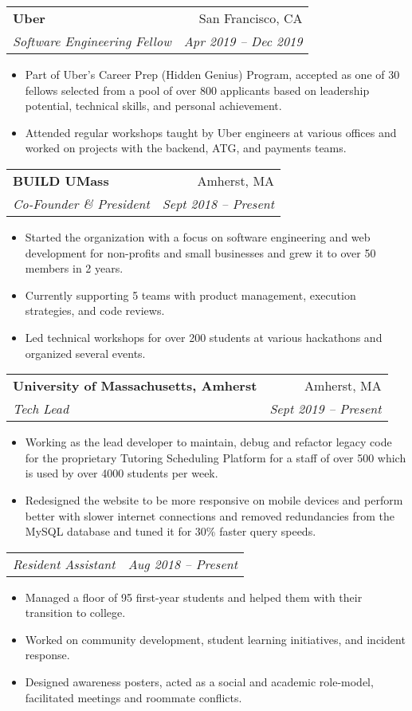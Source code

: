 \documentclass[letterpaper,11pt]{article}
\makeatletter
\newcommand{\resumeItemNew}[1]{
  \item\small{
    #1 \vspace{-2pt}
  }
}
\newcommand{\resumeSubheading}[4]{
  \vspace{0pt}\item
    \begin{tabular*}{0.97\textwidth}{l@{\extracolsep{\fill}}r}
      \textbf{#1} & \small#2  \\
      \textit{\small#3} & \textit{\small #4} \\
    \end{tabular*}\vspace{-7pt}
}
\newcommand{\resumeSubheadingNew}[2]{
  \vspace{-5pt}\item
    \begin{tabular*}{0.97\textwidth}{l@{\extracolsep{\fill}}r}
      \textit{\small#1} & \textit{\small #2} \\
    \end{tabular*}\vspace{-7pt}
}
\newcommand{\resumeItemListStart}{\begin{itemize}}
\newcommand{\resumeItemListEnd}{\end{itemize}\vspace{-5pt}}
\makeatother
\begin{document}
    \resumeSubheading
      {Uber}{San Francisco, CA}
      {Software Engineering Fellow}{Apr 2019 -- Dec 2019}
      \resumeItemListStart
            \resumeItemNew
            {Part of Uber’s Career Prep (Hidden Genius) Program, accepted as one of 30 fellows selected from a pool of over 800 applicants based on leadership potential, technical skills, and personal achievement.}
            \resumeItemNew
            {Attended regular workshops taught by Uber engineers at various offices and worked on projects with the backend, ATG, and payments teams.}
      \resumeItemListEnd
      
     \resumeSubheading
    {BUILD UMass}{Amherst, MA}
    {Co-Founder \& President} {Sept 2018 -- Present}
    \resumeItemListStart
        \resumeItemNew
          {Started the organization with a focus on software engineering and web development for non-profits and small businesses and grew it to over 50 members in 2 years.}
        \resumeItemNew
          {Currently supporting 5 teams with product management, execution strategies, and code reviews.}
        \resumeItemNew
          {Led technical workshops for over 200 students at various hackathons and organized several events.}
    \resumeItemListEnd
    
    \resumeSubheading
      {University of Massachusetts, Amherst}{Amherst, MA}
      {Tech Lead}{Sept 2019 -- Present}
      \resumeItemListStart
            \resumeItemNew
            {Working as the lead developer to maintain, debug and refactor legacy code for the proprietary Tutoring Scheduling Platform for a staff of over 500 which is used by over 4000 students per week.}
            \resumeItemNew
            {Redesigned the website to be more responsive on mobile devices and perform better with slower internet connections and removed redundancies from the MySQL database and tuned it for 30\% faster query speeds.}
      \resumeItemListEnd
    \resumeSubheadingNew{Resident Assistant}{Aug 2018 -- Present}
      \resumeItemListStart
            \resumeItemNew
            {Managed a floor of 95 first-year students and helped them with their transition to college.}
            \resumeItemNew
            {Worked on community development, student learning initiatives, and incident response.}
            \resumeItemNew
            {Designed awareness posters, acted as a social and academic role-model, facilitated meetings and roommate conflicts.}
      \resumeItemListEnd
      
\end{document}

